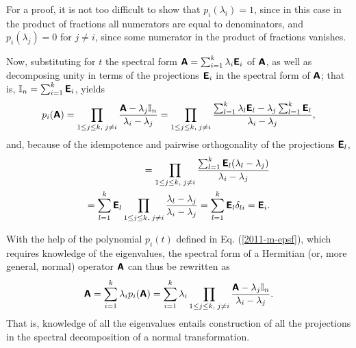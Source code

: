 {\color{OliveGreen}\bproof

For a proof, it is not too difficult
to show that
$p_i  (\lambda_i)=1$, since in this case in the product of fractions all numerators are equal to denominators,
and
$p_i  (\lambda_j)=0$ for $j\neq i $, since some numerator in the product of fractions vanishes.

Now, substituting for $t$ the spectral form $\textsf{\textbf{A}}=\sum_{i=1}^k \lambda_i\textsf{\textbf{E}}_i$
of $\textsf{\textbf{A}}$, as well as
decomposing unity in terms of the projections $\textsf{\textbf{E}}_i$ in the spectral form of
$\textsf{\textbf{A}}$; that is, ${\Bbb I}_n=\sum_{i=1}^k \textsf{\textbf{E}}_i$,
yields
\begin{equation}
p_i  (\textsf{\textbf{A}})
=
\prod_{
1\le j\le k,\;
j\neq i
}\frac{\textsf{\textbf{A}} - \lambda_j{\Bbb I}_n}{\lambda_i -\lambda_j}
=
\prod_{
1\le j\le k,\;
j\neq i
}\frac{\sum_{l=1}^k \lambda_l\textsf{\textbf{E}}_l - \lambda_j\sum_{l=1}^k \textsf{\textbf{E}}_l}{\lambda_i -\lambda_j},
\end{equation}
and, because of the idempotence and pairwise orthogonality of the projections  $\textsf{\textbf{E}}_l$,
\begin{equation}
\begin{split}
=
\prod_{
1\le j\le k,\;
j\neq i
}\frac{\sum_{l=1}^k \textsf{\textbf{E}}_l(\lambda_l- \lambda_j)}{\lambda_i -\lambda_j}  \\
= \sum_{l=1}^k \textsf{\textbf{E}}_l
\prod_{
1\le j\le k,\;
j\neq i
}\frac{\lambda_l- \lambda_j}{\lambda_i -\lambda_j}
= \sum_{l=1}^k \textsf{\textbf{E}}_l
\delta_{li} = \textsf{\textbf{E}}_i.
\label{2012-m-ch-fdvs-cc}
\end{split}
\end{equation}
\eproof
}

With the help of the polynomial $p_i(t)$ defined in Eq. (\ref{2011-m-epsf}),
which requires knowledge of the eigenvalues,
the spectral form of a Hermitian (or, more general, normal) operator  $\textsf{\textbf{A}}$ can thus be rewritten as
\begin{equation}
\textsf{\textbf{A}}=\sum_{i=1}^k \lambda_i p_i(\textsf{\textbf{A}})=  \sum_{i=1}^k \lambda_i \prod_{
1\le j\le k,\;
j\neq i
}\frac{\textsf{\textbf{A}} - \lambda_j{\Bbb I}_n}{\lambda_i -\lambda_j}.
\end{equation}
That is, knowledge of all the eigenvalues entails construction
of all the projections in the spectral decomposition
of a normal transformation.


